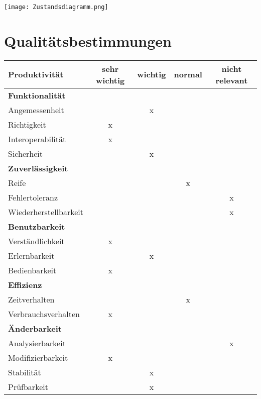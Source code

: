 \documentclass[parskip=full,11pt]{scrartcl}
\begin{document}
\begin{center}
	\texttt{[image: Zustandsdiagramm.png]}
	\end{center}
	
\section{Qualitätsbestimmungen}

\renewcommand{\arraystretch}{1.5}
\begin{table}[H]
  \begin{center}
    \begin{tabularx}{\textwidth}{X c c c c}
      \hline
      
      \textbf{{\large Produktivität}} & \textbf{{\large sehr wichtig}} & \textbf{{\large wichtig}} & \textbf{{\large normal} } &\textbf{{\large nicht relevant }}\\
      
      \hline      
      \multicolumn{5}{l}{\textbf{Funktionalität}}\\      
      \hline      
      Angemessenheit &   & x &   &  \\
	  Richtigkeit & x &   &   &  \\
	  Interoperabilität & x &   &   &  \\
      Sicherheit &   & x &   &  \\	
		    
	  \hline	  
      \multicolumn{5}{l}{\textbf{Zuverlässigkeit}}\\     
      \hline
      Reife &   &   & x &  \\
	  Fehlertoleranz &   &   &   & x\\
	  Wiederherstellbarkeit &   &   &   & x\\
		
	  \hline	  	
	  \multicolumn{5}{l}{\textbf{Benutzbarkeit}}\\
      \hline
      Verständlichkeit & x &   &   &  \\
	  Erlernbarkeit &   & x &   &  \\
	  Bedienbarkeit & x &   &   &  \\
	  
	  \hline	  	
	  \multicolumn{5}{l}{\textbf{Effizienz}}\\
      \hline
      Zeitverhalten &   &   & x &  \\
	  Verbrauchsverhalten & x &   &   &  \\	
	  
	  \hline	  	
	  \multicolumn{5}{l}{\textbf{Änderbarkeit}}\\
      \hline
      Analysierbarkeit &   &   &   & x\\
	  Modifizierbarkeit & x &   &   &  \\
	  Stabilität &   & x &   &  \\
	  Prüfbarkeit &  & x &  & \\


\end{tabularx}
\end{center}
\end{table}
\end{document}
